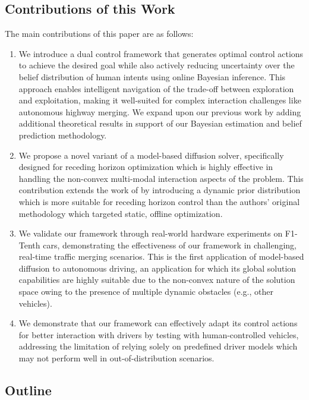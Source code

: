 \documentclass[letterpaper, 10 pt, conference]{IEEEconf}
\begin{document}
\subsection{Contributions of this Work}
The main contributions of this paper are as follows:
\begin{enumerate}
\item We introduce a dual control framework that generates optimal control actions to achieve the desired goal while also actively reducing uncertainty over the belief distribution of human intents using online Bayesian inference. 
This approach enables intelligent navigation of the trade-off between exploration and exploitation, making it well-suited for complex interaction challenges like autonomous highway merging. 
We expand upon our previous work \cite{knaup2024active} by adding additional theoretical results in support of our Bayesian estimation and belief prediction methodology.

\item We propose a novel variant of a model-based diffusion solver, specifically designed for receding horizon optimization which is highly effective in handling the non-convex multi-modal interaction aspects of the problem. 
This contribution extends the work of \cite{pan2024model} by introducing a dynamic prior distribution which is more suitable for receding horizon control than the authors' original methodology which targeted static, offline optimization.

\item We validate our framework through real-world hardware experiments on F1-Tenth cars, demonstrating the effectiveness of our framework in challenging, real-time traffic merging scenarios. 
This is the first application of model-based diffusion to autonomous driving, an application for which its global solution capabilities are highly suitable due to the non-convex nature of the solution space owing to the presence of multiple dynamic obstacles (e.g., other vehicles).

\item We demonstrate that our framework can effectively adapt its control actions for better interaction with drivers by testing with human-controlled vehicles, addressing the limitation of relying solely on predefined driver models which may not perform well in out-of-distribution scenarios.

\end{enumerate}


\subsection{Outline}
\end{document}
